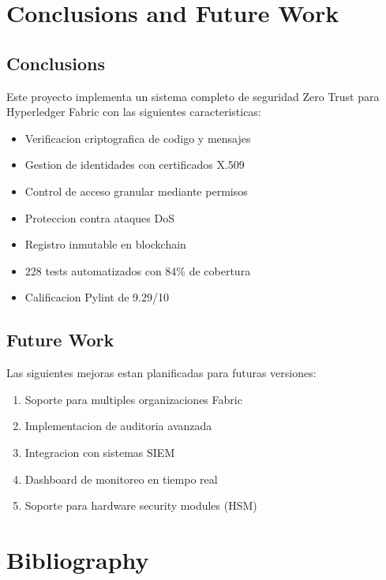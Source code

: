 \documentclass[12pt,a4paper]{report}
\begin{document}
\chapter{Conclusions and Future Work}
\cleardoublepage

\section{Conclusions}

Este proyecto implementa un sistema completo de seguridad Zero Trust para Hyperledger Fabric con las siguientes caracteristicas:

\begin{itemize}
    \item Verificacion criptografica de codigo y mensajes
    \item Gestion de identidades con certificados X.509
    \item Control de acceso granular mediante permisos
    \item Proteccion contra ataques DoS
    \item Registro inmutable en blockchain
    \item 228 tests automatizados con 84\% de cobertura
    \item Calificacion Pylint de 9.29/10
\end{itemize}

\section{Future Work}

Las siguientes mejoras estan planificadas para futuras versiones:

\begin{enumerate}
    \item Soporte para multiples organizaciones Fabric
    \item Implementacion de auditoria avanzada
    \item Integracion con sistemas SIEM
    \item Dashboard de monitoreo en tiempo real
    \item Soporte para hardware security modules (HSM)
\end{enumerate}

\cleardoublepage

\chapter{Bibliography}
\cleardoublepage
{}
\end{document}
